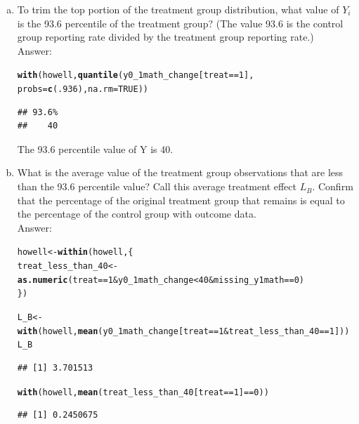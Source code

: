 \documentclass[11pt,notitlepage]{article}\usepackage[]{graphicx}\usepackage[]{color}
\makeatletter
\newcommand{\hlnum}[1]{\textcolor[rgb]{0.686,0.059,0.569}{#1}}%
\newcommand{\hlopt}[1]{\textcolor[rgb]{0,0,0}{#1}}%
\newcommand{\hlstd}[1]{\textcolor[rgb]{0.345,0.345,0.345}{#1}}%
\newcommand{\hlkwb}[1]{\textcolor[rgb]{0.69,0.353,0.396}{#1}}%
\newcommand{\hlkwc}[1]{\textcolor[rgb]{0.333,0.667,0.333}{#1}}%
\newcommand{\hlkwd}[1]{\textcolor[rgb]{0.737,0.353,0.396}{\textbf{#1}}}%
\newenvironment{kframe}{%
 \def\at@end@of@kframe{}%
 \ifinner\ifhmode%
  \def\at@end@of@kframe{\end{minipage}}%
  \begin{minipage}{\columnwidth}%
 \fi\fi%
 \def\FrameCommand##1{\hskip\@totalleftmargin \hskip-\fboxsep
 \colorbox{shadecolor}{##1}\hskip-\fboxsep
     \hskip-\linewidth \hskip-\@totalleftmargin \hskip\columnwidth}%
 \MakeFramed {\advance\hsize-\width
   \@totalleftmargin\z@ \linewidth\hsize
   \@setminipage}}%
 {\par\unskip\endMakeFramed%
 \at@end@of@kframe}
\newenvironment{knitrout}{}{} %
\makeatother
\begin{document}
\begin{enumerate}[a)]
\begin{knitrout}
{}



\end{knitrout}


\item To trim the top portion of the treatment group distribution, what value of $Y_i$ is the 93.6 percentile of the treatment group? (The value 93.6 is the control group reporting rate divided by the treatment group reporting rate.)\\
Answer:\\
\begin{knitrout}
\color{fgcolor}\begin{kframe}
\begin{alltt}
\hlkwd{with}\hlstd{(howell,} \hlkwd{quantile}\hlstd{(y0_1math_change[treat}\hlopt{==}\hlnum{1}\hlstd{],}
                      \hlkwc{probs} \hlstd{=} \hlkwd{c}\hlstd{(}\hlnum{.936}\hlstd{),}\hlkwc{na.rm}\hlstd{=}\hlnum{TRUE}\hlstd{))}
\end{alltt}
\begin{verbatim}
## 93.6% 
##    40
\end{verbatim}
\end{kframe}
\end{knitrout}

The 93.6 percentile value of Y is 40.

\item What is the average value of the treatment group observations that are less than the 93.6 percentile value? Call this average treatment effect $L_B$. Confirm that the percentage of the original treatment group that remains is equal to the percentage of the control group with outcome data.\\
Answer:\\
\begin{knitrout}
\color{fgcolor}\begin{kframe}
\begin{alltt}
\hlstd{howell} \hlkwb{<-} \hlkwd{within}\hlstd{(howell,\{}
  \hlstd{treat_less_than_40} \hlkwb{<-} \hlkwd{as.numeric}\hlstd{(treat} \hlopt{==} \hlnum{1} \hlopt{&} \hlstd{y0_1math_change} \hlopt{<}\hlnum{40} \hlopt{&} \hlstd{missing_y1math}\hlopt{==}\hlnum{0}\hlstd{)}
\hlstd{\})}

\hlstd{L_B} \hlkwb{<-} \hlkwd{with}\hlstd{(howell,} \hlkwd{mean}\hlstd{(y0_1math_change[treat}\hlopt{==}\hlnum{1} \hlopt{&} \hlstd{treat_less_than_40}\hlopt{==}\hlnum{1}\hlstd{]))}
\hlstd{L_B}
\end{alltt}
\begin{verbatim}
## [1] 3.701513
\end{verbatim}
\begin{alltt}
\hlkwd{with}\hlstd{(howell,} \hlkwd{mean}\hlstd{(treat_less_than_40[treat}\hlopt{==}\hlnum{1}\hlstd{]}\hlopt{==}\hlnum{0}\hlstd{))}
\end{alltt}
\begin{verbatim}
## [1] 0.2450675
\end{verbatim}
\end{kframe}
\end{knitrout}


\end{enumerate}
\end{document}
